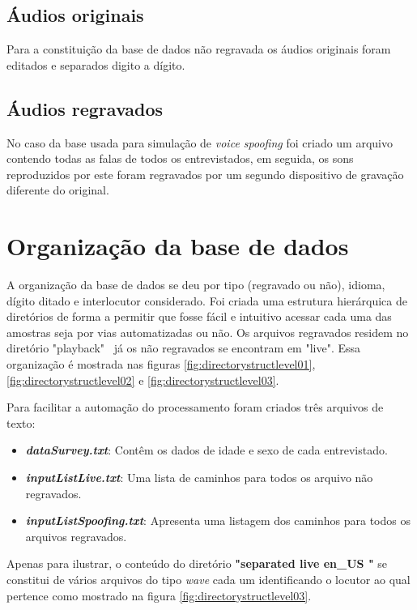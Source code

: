 \begin{myenv}{1.5}
			\subsection{Áudios originais}
				\par Para a constituição da base de dados não regravada os áudios originais foram editados e separados digito a dígito.
	
			\subsection{Áudios regravados}
				\par No caso da base usada para simulação de \textit{voice spoofing} foi criado um arquivo contendo todas as falas de todos os entrevistados, em seguida, os sons reproduzidos por este foram regravados por um segundo dispositivo de gravação diferente do original.

		\section{Organização da base de dados}
			\par A organização da base de dados se deu por tipo (regravado ou não), idioma, dígito ditado e interlocutor considerado. Foi criada uma estrutura hierárquica de diretórios de forma a permitir que fosse fácil e intuitivo acessar cada uma das amostras seja por vias automatizadas ou não. Os arquivos regravados residem no diretório "playback" \ já os não regravados se encontram em "live".	Essa organização é mostrada nas figuras \ref{fig:directorystructlevel01}, \ref{fig:directorystructlevel02} e \ref{fig:directorystructlevel03}.
			
			\par Para facilitar a automação do processamento foram criados três arquivos de texto:
			\begin{itemize}
				\item \textit{\textbf{dataSurvey.txt}}: Contêm os dados de idade e sexo de cada entrevistado.
				\item \textit{\textbf{inputListLive.txt}}: Uma lista de caminhos para todos os arquivo não regravados.
				\item \textit{\textbf{inputListSpoofing.txt}}: Apresenta uma listagem dos caminhos para todos os arquivos regravados.
			\end{itemize}
		
			\par Apenas para ilustrar, o conteúdo do diretório \textbf{"separated \textfractionsolidus live \textfractionsolidus en\_US "} se constitui de vários arquivos do tipo \textit{wave} cada um identificando o locutor ao qual pertence como mostrado na  figura \ref{fig:directorystructlevel03}.
				

\end{myenv}
